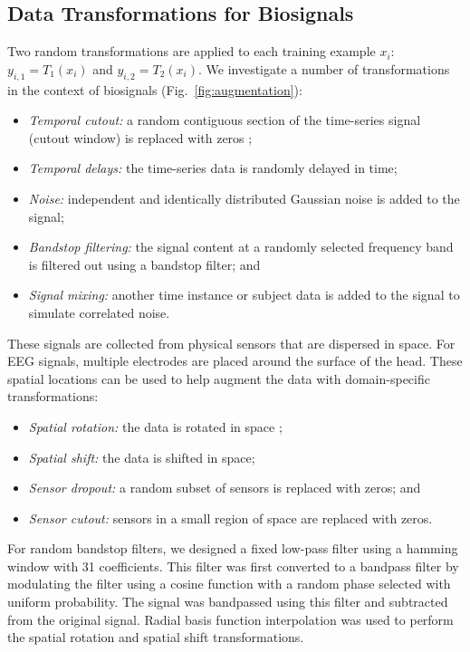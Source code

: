 \documentclass{article}
\begin{document}
\subsection{Data Transformations for Biosignals}

Two random transformations are applied to each training example $x_i$: $y_{i,1}
= T_1(x_i)$ and $y_{i,2} = T_2(x_i)$. We investigate a number of transformations
in the context of biosignals (Fig.~\ref{fig:augmentation}):
\begin{itemize}
  \setlength{\itemsep}{0pt}
  \item \textit{Temporal cutout:} a random contiguous section of the time-series
  signal (cutout window) is replaced with zeros \cite{devries_improved_2017};
  \item \textit{Temporal delays:} the time-series data is randomly delayed in time;
  \item \textit{Noise:} independent and identically distributed Gaussian noise is added to the signal;
  \item \textit{Bandstop filtering:} the signal content at a randomly selected
  frequency band is filtered out using a bandstop filter; and
  \item \textit{Signal mixing:} another time instance or subject data is added to the signal to simulate correlated noise.
\end{itemize}

These signals are collected from physical sensors that are dispersed in space.
For EEG signals, multiple electrodes are placed around the surface of the head.
These spatial locations can be used to help augment the data with
domain-specific transformations:
\begin{itemize}
  \setlength{\itemsep}{0pt}
  \item \textit{Spatial rotation:} the data is rotated in space \cite{krell_rotational_2017};
  \item \textit{Spatial shift:} the data is shifted in space;
  \item \textit{Sensor dropout:} a random subset of sensors is replaced with zeros; and
  \item \textit{Sensor cutout:} sensors in a small region of space are replaced
  with zeros.
\end{itemize}

For random bandstop filters, we designed a fixed low-pass filter using a hamming
window with 31 coefficients. This filter was first converted to a bandpass
filter by modulating the filter using a cosine function with a random phase
selected with uniform probability. The signal was bandpassed using this filter
and subtracted from the original signal. Radial basis function interpolation was
used to perform the spatial rotation and spatial shift transformations.
\end{document}
